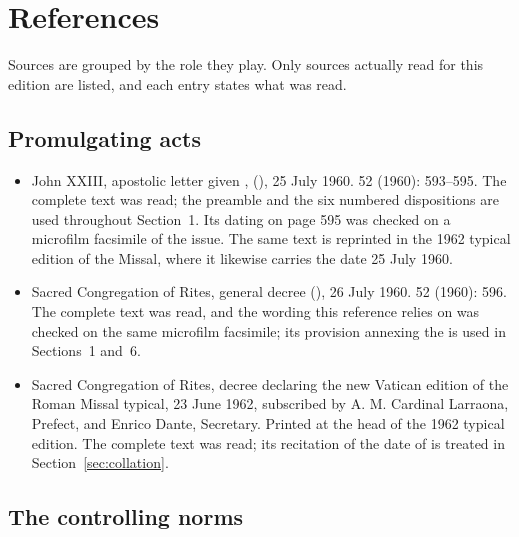 \section{References}

Sources are grouped by the role they play. Only sources actually read for this edition are
listed, and each entry states what was read.

\subsection{Promulgating acts}

\begin{itemize}[leftmargin=1.3em, itemsep=0.3em]
\item John XXIII, apostolic letter given ,  (), 25 July 1960.  52 (1960): 593--595. The complete text was read; the preamble and the six
numbered dispositions are used throughout Section~1. Its dating on page 595 was checked on a
microfilm facsimile of the issue. The same text is reprinted in the 1962 typical edition of the
Missal, where it likewise carries the date 25 July 1960.
\item Sacred Congregation of Rites, general decree  (), 26 July 1960.  52 (1960): 596. The complete text was read, and the wording this
reference relies on was checked on the same microfilm facsimile; its provision annexing the
 is used in Sections~1 and~6.
\item Sacred Congregation of Rites, decree declaring the new Vatican edition of the Roman Missal
typical, 23 June 1962, subscribed by A. M. Cardinal Larraona, Prefect, and Enrico Dante,
Secretary. Printed at the head of the 1962 typical edition. The complete text was read; its
recitation of the date of  is treated in Section~\ref{sec:collation}.
\end{itemize}

\subsection{The controlling norms}

